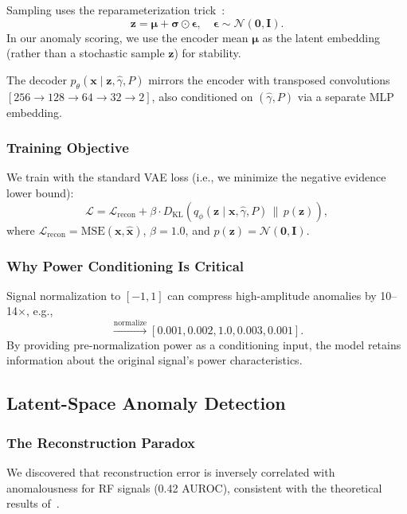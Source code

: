 \documentclass[conference]{IEEEtran}
\begin{document}
Sampling uses the reparameterization trick~\cite{kingma2014aevb}:
\begin{equation}
\mathbf{z} = \boldsymbol{\mu} + \boldsymbol{\sigma} \odot \boldsymbol{\epsilon}, \quad \boldsymbol{\epsilon} \sim \mathcal{N}(\mathbf{0}, \mathbf{I}).
\end{equation}
In our anomaly scoring, we use the encoder mean $\boldsymbol{\mu}$ as the latent embedding (rather than a stochastic sample $\mathbf{z}$) for stability.

The decoder $p_{\theta}(\mathbf{x}\mid \mathbf{z}, \hat{\gamma}, P)$ mirrors the encoder with transposed convolutions $[256 \rightarrow 128 \rightarrow 64 \rightarrow 32 \rightarrow 2]$, also conditioned on $(\hat{\gamma}, P)$ via a separate MLP embedding.

\subsubsection{Training Objective}
We train with the standard VAE loss (i.e., we minimize the negative evidence lower bound):
\begin{equation}
\mathcal{L} = \mathcal{L}_{\mathrm{recon}} + \beta \cdot D_{\mathrm{KL}}\left(q_{\phi}(\mathbf{z}\mid \mathbf{x},\hat{\gamma},P)\,\|\,p(\mathbf{z})\right),
\end{equation}
where $\mathcal{L}_{\mathrm{recon}} = \mathrm{MSE}(\mathbf{x}, \hat{\mathbf{x}})$, $\beta=1.0$, and $p(\mathbf{z})=\mathcal{N}(\mathbf{0},\mathbf{I})$.

\subsubsection{Why Power Conditioning Is Critical}
Signal normalization to $[-1,1]$ can compress high-amplitude anomalies by 10--14$\times$, e.g.,
\begin{equation}
[0.1, 0.2, 100, 0.3, 0.1] \xrightarrow{\mathrm{normalize}} [0.001, 0.002, 1.0, 0.003, 0.001].
\end{equation}
By providing pre-normalization power as a conditioning input, the model retains information about the original signal's power characteristics.

\subsection{Latent-Space Anomaly Detection}
\subsubsection{The Reconstruction Paradox}
We discovered that reconstruction error is inversely correlated with anomalousness for RF signals (0.42 AUROC), consistent with the theoretical results of~\cite{bouman2025}.
\end{document}

